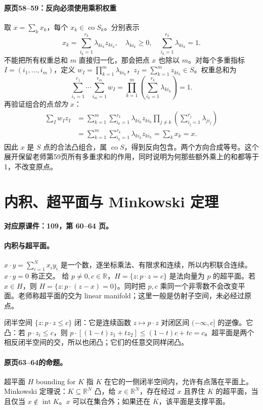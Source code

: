 \documentclass[11pt,a4paper]{article}
\newcommand{\R}{\mathbb{R}}\newcommand{\N}{\mathbb{N}}
\DeclareMathOperator{\Int}{int}\DeclareMathOperator{\diam}{diam}
\theoremstyle{definition}\newtheorem{definition}{定义}\newtheorem{example}{例}
\begin{document}
\paragraph{原页58--59：反向必须使用乘积权重}
取 $x=\sum_k x_k$，每个 $x_k\in\operatorname{co}S_k$。分别表示
\[x_k=\sum_{i_k=1}^{r_k}\lambda_{k i_k}z_{k i_k},\quad \lambda_{k i_k}\ge0,\quad\sum_{i_k=1}^{r_k}\lambda_{k i_k}=1.\]
不能把所有权重总和 $m$ 直接归一化，那会把点 $x$ 也除以 $m$。对每个多重指标 $I=(i_1,\ldots,i_m)$，定义 $w_I=\prod_{k=1}^m\lambda_{k i_k}$，$z_I=\sum_{k=1}^m z_{k i_k}\in S$。权重总和为
\[\sum_{i_1=1}^{r_1}\cdots\sum_{i_m=1}^{r_m}w_I=\prod_{k=1}^m\left(\sum_{i_k=1}^{r_k}\lambda_{k i_k}\right)=1.\]
再验证组合的点\emph{恰为} $x$：
\begin{align*}
\sum_Iw_Iz_I
&=\sum_{k=1}^m\sum_{i_k=1}^{r_k}\lambda_{k i_k}z_{k i_k}
\prod_{j\ne k}\left(\sum_{i_j=1}^{r_j}\lambda_{j i_j}\right)\\
&=\sum_{k=1}^m\sum_{i_k=1}^{r_k}\lambda_{k i_k}z_{k i_k}
=\sum_kx_k=x.
\end{align*}
因此 $x$ 是 $S$ 点的合法凸组合，属 $\operatorname{co}S$，得到反向包含。两个方向合成等号。这个展开保留老师第59页所有多重求和的作用，同时说明为何那些额外乘上的和都等于1，不改变原点。


\clearpage\section{内积、超平面与 Minkowski 定理}\label{g:109:60}

\textbf{对应原课件：109，第 60--64 页。}


\paragraph{内积与超平面。}
$x\cdot y=\sum_{i=1}^N x_i y_i$ 是一个数，逐坐标乘法、有限求和连续，所以内积联合连续。$x\cdot y=0$ 称正交。
给 $p\ne0,c\in\R$，$H=\{z:p\cdot z=c\}$ 是法向量为 $p$ 的超平面。若 $x\in H$，则 $H=\{z:p\cdot(z-x)=0\}$。同时把 $p,c$ 乘同一个非零数不会改变平面。老师称超平面的交为 linear manifold；这里一般是仿射子空间，未必经过原点。

闭半空间 $\{z:p\cdot z\le c\}$ 闭：它是连续函数 $z\mapsto p\cdot z$ 对闭区间 $(-\infty,c]$ 的逆像。它凸：若 $p\cdot z_i\le c$，则 $p\cdot[(1-t)z_1+tz_2]\le(1-t)c+tc=c$。超平面是两个相反闭半空间的交，所以也闭凸；它们的任意交同样闭凸。
\paragraph{原页63--64的命题。}
超平面 $H$ bounding for $K$ 指 $K$ 在它的一侧闭半空间内，允许有点落在平面上。Minkowski 定理说：$K\subseteq\R^N$ 凸，给 $x\in\R^N$，存在经过 $x$ 且界住 $K$ 的超平面，当且仅当 $x\notin\Int K$。$x$ 可以在集合外；如果还在 $\overline K$，该平面是支撑平面。
\end{document}

